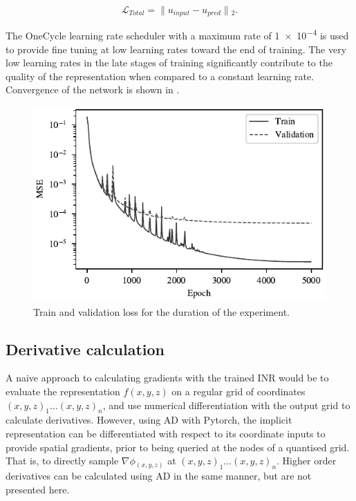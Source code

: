 \begin{equation}
    \label{eqn:cri}
    \mathcal{L}_{Total} = \lVert{}u_{input} - u_{pred}\rVert{}_{2}. %
\end{equation}

The OneCycle learning rate scheduler \parencite{smithSuperconvergenceVeryFast2018} with a maximum rate of \num{1e-4} is used to provide fine tuning at low learning rates toward the end of training.
The very low learning rates in the late stages of training significantly contribute to the quality of the representation when compared to a constant learning rate.
Convergence of the network is shown in .


\begin{figure}[hbtp]
    \centering
    \includegraphics[width=0.75\linewidth]{fig/p3/loss_plot.pdf}
    \caption[Training convergence]{Train and validation loss for the duration of the experiment.}
    \label{fig:convergence}
\end{figure}

\subsection{Derivative calculation}
A naive approach to calculating gradients with the trained INR would be to evaluate the representation \(f(x, y, z)\) on a regular grid of coordinates \({(x, y, z)}_1 \dots {(x, y, z)}_n\), and use numerical differentiation with the output grid to calculate derivatives.
However, using AD with Pytorch, the implicit representation can be differentiated with respect to its coordinate inputs to provide spatial gradients, prior to being queried at the nodes of a quantised grid.
That is, to directly sample \(\nabla{}\phi{}_{(x, y, z)}\) at \({(x, y, z)}_1 \dots {(x, y, z)}_n\).
Higher order derivatives can be calculated using AD in the same manner, but are not presented here.

